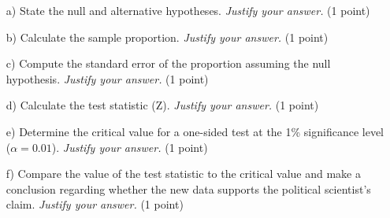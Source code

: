 \documentclass{article}
\begin{document}
\begin{enumerate}
\item[a)] State the null and alternative hypotheses. \emph{Justify your answer.} (1 point)
\begin{center}
\end{center}

\item[b)] Calculate the sample proportion. \emph{Justify your answer.} (1 point)
\begin{center}
\end{center}

\item[c)] Compute the standard error of the proportion assuming the null hypothesis. \emph{Justify your answer.} (1 point)
\begin{center}
\end{center}

\newpage
\item[d)] Calculate the test statistic (Z). \emph{Justify your answer.} (1 point)
\begin{center}
\end{center}

\item[e)] Determine the critical value for a one-sided test at the 1\% significance level ($\alpha=0.01$). \emph{Justify your answer.} (1 point)
\begin{center}
\end{center}

\item[f)] Compare the value of the test statistic to the critical value and make a conclusion regarding whether the new data supports the political scientist's claim. \emph{Justify your answer.} (1 point)
\begin{center}
\end{center}

\end{enumerate}
\end{document}
